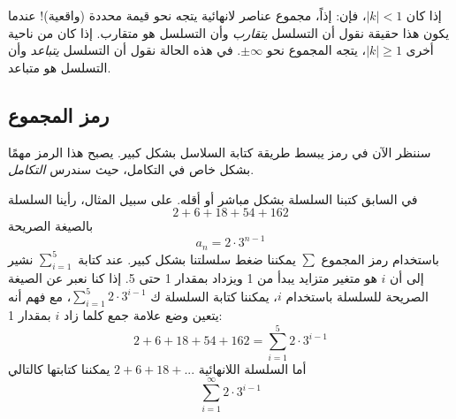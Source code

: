 إذا كان $ {|k|<1} $، فإن:
إذاً، مجموع عناصر لانهائية يتجه نحو قيمة محددة (واقعية)! عندما يكون هذا حقيقة نقول أن التسلسل \textit{يتقارب} وأن التسلسل هو متقارب. إذا كان من ناحية أخرى $ |k|\geq 1$، يتجه المجموع نحو $ \pm \infty$. في هذه الحالة نقول أن التسلسل \textit{يتباعد} وأن التسلسل هو متباعد.\regv
{}
\newpage
{}

\newpage
\subsection{رمز المجموع}
سننظر الآن في رمز يبسط طريقة كتابة السلاسل بشكل كبير. يصبح هذا الرمز مهمًا بشكل خاص في {التكامل}، حيث سندرس \textit{التكامل}.\vsk

في السابق كتبنا السلسلة بشكل مباشر أو أقله. على سبيل المثال، رأينا السلسلة
\[ 2+6+18+54+162 \]
بالصيغة الصريحة
\[ a_n = 2\cdot3^{n-1} \]
باستخدام رمز المجموع $ \sum $ يمكننا ضغط سلسلتنا بشكل كبير. عند كتابة $ \sum\limits_{i=1}^5 $ نشير إلى أن $ i $ هو متغير متزايد يبدأ من 1 ويزداد بمقدار 1 حتى 5. إذا كنا نعبر عن الصيغة الصريحة للسلسلة باستخدام $ i $، يمكننا كتابة السلسلة ك $ \sum\limits_{i=1}^5 2\cdot3^{i-1} $، مع فهم أنه يتعين وضع علامة جمع كلما زاد $ i $ بمقدار 1:
\[ 2+6+18+54+162=\sum\limits_{i=1}^5 2\cdot3^{i-1} \]
أما السلسلة اللانهائية 
$ 2+6+18+... $ يمكننا كتابتها كالتالي
\[ \sum\limits_{i=1}^\infty 2\cdot3^{i-1} \]

